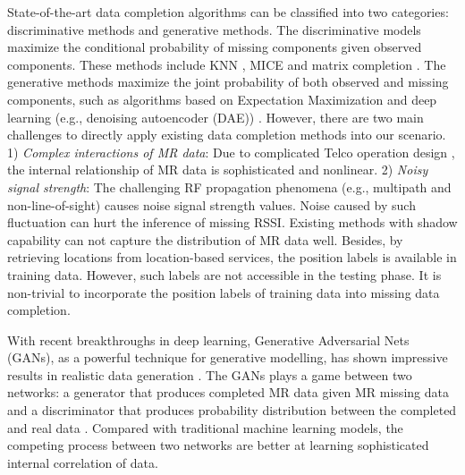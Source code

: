 State-of-the-art data completion algorithms can be classified into two categories: discriminative methods and generative methods. The discriminative models maximize the conditional probability of missing components given observed components. These methods include KNN \cite{DBLP:journals/bioinformatics/TroyanskayaCSBHTBA01}, MICE\cite{buuren2010mice} and matrix completion \cite{DBLP:journals/jmlr/MazumderHT10}. The generative methods maximize the joint probability of both observed and missing components, such as algorithms based on Expectation Maximization \cite{DBLP:journals/nca/Garcia-LaencinaSF10} and deep learning (e.g., denoising autoencoder (DAE)) \cite{DBLP:conf/icml/VincentLBM08,DBLP:conf/pakdd/GondaraW18}. However, there are two main challenges to directly apply existing data completion methods into our scenario. 1) \emph{Complex interactions of MR data}: Due to complicated Telco operation design \cite{DBLP:conf/infocom/MargoliesBBDJUV17}, the internal relationship of MR data is sophisticated and nonlinear. 2) \emph{Noisy signal strength}: The challenging RF propagation phenomena (e.g., multipath and non-line-of-sight) causes noise signal strength values. Noise caused by such fluctuation can hurt the inference of missing RSSI. Existing methods with shadow capability can not capture the distribution of MR data well. Besides, by retrieving locations from location-based services, the position labels is available in training data. However, such labels are not accessible in the testing phase. It is non-trivial to incorporate the position labels of training data into missing data completion.


With recent breakthroughs in deep learning, Generative Adversarial Nets (GANs), as a powerful technique for generative modelling, has shown impressive results in realistic data generation \cite{DBLP:conf/nips/GoodfellowPMXWOCB14,DBLP:conf/cvpr/LedigTHCCAATTWS17}. The GANs plays a game between two networks: a generator that produces completed MR data given MR missing data and a discriminator that produces probability distribution between the completed and real data \cite{DBLP:conf/nips/GoodfellowPMXWOCB14}. Compared with traditional machine learning models, the competing process between two networks are better at learning sophisticated internal correlation of data.

